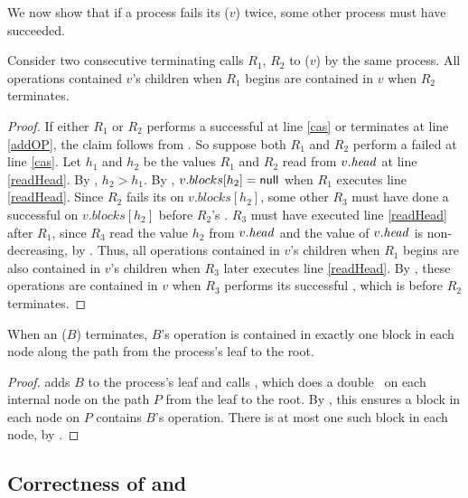 We now show that if a process fails its ($v$) twice, some other process must have succeeded.

\begin{lemma}\label{lem::doubleRefresh}
Consider two consecutive terminating calls $R_1$, $R_2$ to ($v$) by the same process.
All operations contained $v$'s children when $R_1$ begins
are contained in $v$ when $R_2$ terminates.
\end{lemma}
\begin{proof}
If either $R_1$ or $R_2$ performs a successful  at line \ref{cas} or terminates at line \ref{addOP}, the claim follows
from .
So suppose both $R_1$ and $R_2$ perform a failed  at line \ref{cas}.
Let $h_1$ and $h_2$ be the values $R_1$ and $R_2$ read from $v.\mbox{\textit{head}}$ at line \ref{readHead}.
By , $h_2>h_1$.
By , $v.blocks[h_2]=\mbox{\sf null}$ when $R_1$ executes line \ref{readHead}.
Since $R_2$ fails its  on $v.blocks[h_2]$, some other  $R_3$ must have done
a successful  on $v.blocks[h_2]$ before $R_2$'s .
$R_3$ must have executed line \ref{readHead} after $R_1$, since $R_3$ read the value $h_2$ from $v.\mbox{\textit{head}}$ and the value of $v.\mbox{\textit{head}}$ is non-decreasing, by .
Thus, all operations contained in $v$'s children when $R_1$ begins
are also contained in $v$'s children when $R_3$ later executes line \ref{readHead}.
By , these operations are contained in $v$ when $R_3$ performs its successful ,
which is before $R_2$ terminates.
\end{proof}

\begin{lemma} \label{lem::appendExactlyOnce}
When an ($B$) terminates, $B$'s operation is contained in exactly one block in each node along the path from the process's leaf to the root.
\end{lemma}
\begin{proof}
 adds $B$ to the process's leaf and calls , which
does a double ~on each internal node on the path $P$ from the leaf to the root.
By , this ensures a block in each node on $P$ contains $B$'s operation.
There is at most one such block in each node, by .
\end{proof}


\subsection{Correctness of  and }
\label{sec::helpingCorrect}

